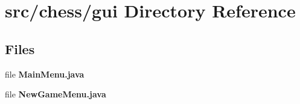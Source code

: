 \section{src/chess/gui Directory Reference}
\label{dir_bc7a69e718a4480a3137372aa5b51c8e}
\subsection*{Files}
\begin{DoxyCompactItemize}
\item 
file {\bf Main\+Menu.\+java}
\item 
file {\bf New\+Game\+Menu.\+java}
\end{DoxyCompactItemize}
